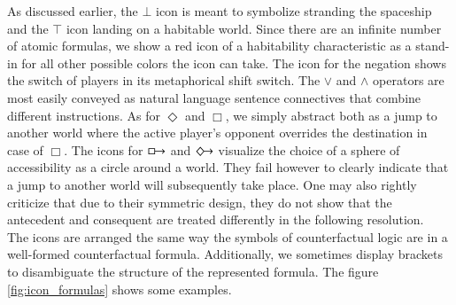 \documentclass[a4paper,american,10pt]{paper}
\theoremstyle{definition}\newtheorem{lemma}[thm]{Lemma}
\theoremstyle{definition}\newtheorem{proposition}[thm]{Proposition}
\theoremstyle{definition}\newtheorem{corollary}[thm]{Corollary}
\theoremstyle{definition}\newtheorem{definition}{Definition}
\begin{document}
As discussed earlier, the $\bot$ icon is meant to symbolize stranding the spaceship and the $\top$ icon landing on a habitable world. Since there are an infinite number of atomic formulas, we show a red icon of a habitability characteristic as a stand-in for all other possible colors the icon can take. The icon for the negation shows the switch of players in its metaphorical shift switch. The $\vee$ and $\wedge$ operators are most easily conveyed as natural language sentence connectives that combine different instructions. As for $\Diamond$ and $\Box$, we simply abstract both as a jump to another world where the active player's opponent overrides the destination in case of $\Box$. The icons for $\boxright$ and $\Diamondright$ visualize the choice of a sphere of accessibility as a circle around a world. They fail however to clearly indicate that a jump to another world will subsequently take place. One may also rightly criticize that due to their symmetric design, they do not show that the antecedent and consequent are treated differently in the following resolution.\\
\indent The icons are arranged the same way the symbols of counterfactual logic are in a well-formed counterfactual formula. Additionally, we sometimes display brackets to disambiguate the structure of the represented formula. The figure \ref{fig:icon_formulas} shows some examples.
\end{document}
